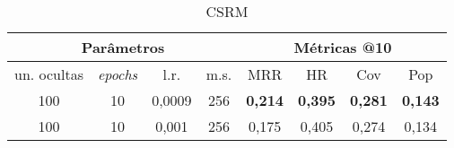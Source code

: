 \begin{table}[htbp]
  \centering
  \begin{tabular}{|c|c|c|c|c|c|c|c|}
    \hline
      \multicolumn{4}{|c|}{Parâmetros} & \multicolumn{4}{c|}{Métricas @10} \\
      \hline
      un. ocultas & \textit{epochs} & l.r. & m.s. & MRR & HR & Cov & Pop \\
      \hline
      100 & 10 & 0,0009 & 256 & \textbf{0,214} & \textbf{0,395} & \textbf{0,281} & \textbf{0,143} \\
      \hline
      100 & 10 & 0,001 & 256 & 0,175 & 0,405 & 0,274 & 0,134 \\
      \hline
\end{tabular}
      \caption{CSRM}
      \label{opt:csrm_last}
\end{table}